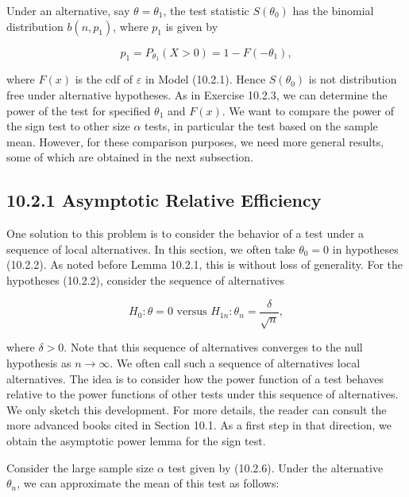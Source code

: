 Under an alternative, say $\theta=\theta_{1}$, the test statistic $S\left(\theta_{0}\right)$ has the binomial distribution $b\left(n, p_{1}\right)$, where $p_{1}$ is given by


\begin{equation*}
p_{1}=P_{\theta_{1}}(X>0)=1-F\left(-\theta_{1}\right), \tag{10.2.12}
\end{equation*}


where $F(x)$ is the cdf of $\varepsilon$ in Model (10.2.1). Hence $S\left(\theta_{0}\right)$ is not distribution free under alternative hypotheses. As in Exercise 10.2.3, we can determine the power of the test for specified $\theta_{1}$ and $F(x)$. We want to compare the power of the sign test to other size $\alpha$ tests, in particular the test based on the sample mean. However, for these comparison purposes, we need more general results, some of which are obtained in the next subsection.

\subsection*{10.2.1 Asymptotic Relative Efficiency}
One solution to this problem is to consider the behavior of a test under a sequence of local alternatives. In this section, we often take $\theta_{0}=0$ in hypotheses (10.2.2). As noted before Lemma 10.2.1, this is without loss of generality. For the hypotheses (10.2.2), consider the sequence of alternatives


\begin{equation*}
H_{0}: \theta=0 \text { versus } H_{1 n}: \theta_{n}=\frac{\delta}{\sqrt{n}}, \tag{10.2.13}
\end{equation*}


where $\delta>0$. Note that this sequence of alternatives converges to the null hypothesis as $n \rightarrow \infty$. We often call such a sequence of alternatives local alternatives. The idea is to consider how the power function of a test behaves relative to the power functions of other tests under this sequence of alternatives. We only sketch this development. For more details, the reader can consult the more advanced books cited in Section 10.1. As a first step in that direction, we obtain the asymptotic power lemma for the sign test.

Consider the large sample size $\alpha$ test given by (10.2.6). Under the alternative\\
$\theta_{n}$, we can approximate the mean of this test as follows:


